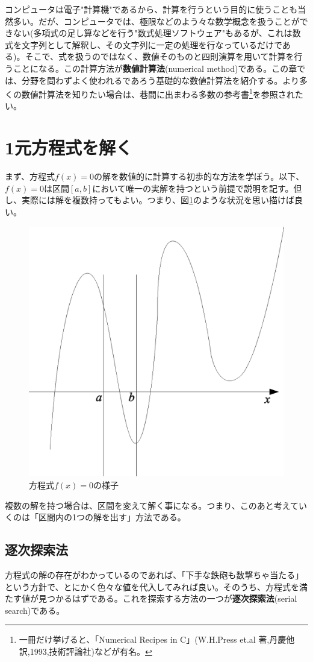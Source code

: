 コンピュータは電子"計算機"であるから、計算を行うという目的に使うことも当然多い。だが、コンピュータでは、極限などのよう々な数学概念を扱うことができない(多項式の足し算などを行う"数式処理ソフトウェア"もあるが、これは数式を文字列として解釈し、その文字列に一定の処理を行なっているだけである)。そこで、式を扱うのではなく、数値そのものと四則演算を用いて計算を行うことになる。この計算方法が\textbf{数値計算法}(numerical method)である。この章では、分野を問わずよく使われるであろう基礎的な数値計算法を紹介する。より多くの数値計算法を知りたい場合は、巷間に出まわる多数の参考書\footnote{一冊だけ挙げると、「Numerical Recipes in C」(W.H.Press et.al 著,丹慶他訳,1993,技術評論社)などが有名。}を参照されたい。

\section{1元方程式を解く}
まず、方程式$f(x)=0$の解を数値的に計算する初歩的な方法を学ぼう。以下、$f(x)=0$は区間$[a,b]$において唯一の実解を持つという前提で説明を記す。但し、実際には解を複数持ってもよい。つまり、図\ref{fig15_1}のような状況を思い描けば良い。
\begin{figure}[htb]
\centering
\includegraphics[width=0.5\linewidth,keepaspectratio]{fig15_1.eps}
\caption{方程式$f(x)=0$の様子}\label{fig15_1}
\end{figure}

複数の解を持つ場合は、区間を変えて解く事になる。つまり、このあと考えていくのは「区間内の1つの解を出す」方法である。

\subsection{逐次探索法}
方程式の解の存在がわかっているのであれば、「下手な鉄砲も数撃ちゃ当たる」という方針で、とにかく色々な値を代入してみれば良い。そのうち、方程式を満たす値が見つかるはずである。これを探索する方法の一つが\textbf{逐次探索法}(serial search)である。

